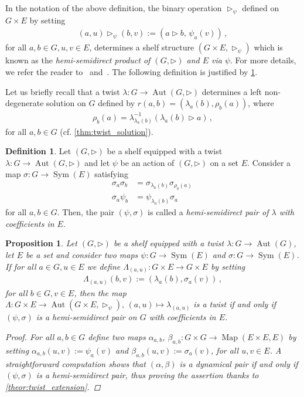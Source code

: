 \documentclass[preprint,1p]{elsarticle}
\numberwithin{equation}{section}
\newtheorem{prop}[theor]{Proposition}
\theoremstyle{definition}               %
\newtheorem{defin}[theor]{Definition}
\newcommand{\tr}{\triangleright}
\DeclareMathOperator{\Sym}{Sym}
\DeclareMathOperator{\Aut}{Aut}
\DeclareMathOperator{\Map}{Map}
\begin{document}
In the notation of the above definition, the binary operation $\tr_\psi$ defined on $G \times E$ by setting 
\begin{align*}
    (a,u) \tr_\psi (b,v) := (a \tr b,\, \psi_a(v)) \,,
\end{align*}
for all $a,b \in G, u,v \in E$, determines a shelf structure $(G \times E, \tr_\psi)$ which is known as the \emph{hemi-semidirect product of $(G,\tr)$ and $E$ via $\psi$}. For more details, we refer the reader to~\cite{CrWag14} and~\cite{Kin07}.
The following definition is justified by \cref{prop:twist_hemi_product}.

\medskip
{
Let us briefly recall that a twist $\lambda:G \to \Aut(G,\tr)$ determines a left non-degenerate solution on $G$ defined by $r(a,b) = (\lambda_a(b),\rho_b(a))$, where
\begin{align}\label{eq:rho_map}
    \rho_b(a) = \lambda_{\lambda_a(b)}^{-1}\left(\lambda_a(b) \tr a \right) \,,
\end{align}
for all $a,b \in G$ (cf. \cref{thm:twist_solution}).}

\begin{defin}
    Let $(G,\tr)$ be a shelf equipped with a twist $\lambda:G \to \Aut(G,\tr)$ and let $\psi$ be an action of $(G,\tr)$ on a set $E$. 
    Consider a map $\sigma:G \to \Sym(E)$ satisfying
    \begin{align} 
            \sigma_a\sigma_b &= \sigma_{\lambda_a(b)}\sigma_{\rho_b(a)} \label{eq:hemi_sol1} \, \\
            \sigma_a\psi_b &= \psi_{\lambda_a(b)}\sigma_a \label{eq:hemi_sol2} \,
    \end{align}
    for all $a,b \in G$.
    Then, the pair $(\psi,\sigma)$ is called a \emph{hemi-semidirect pair of $\lambda$ with coefficients in $E$}.
\end{defin}

\begin{prop}\label{prop:twist_hemi_product}
    Let $(G,\tr)$ be a shelf equipped with a twist $\lambda:G \to \Aut(G)$, let $E$ be a set and consider two maps $\psi:G \to \Sym(E)$ and $\sigma:G \to \Sym(E)$.
    If for all $a \in G, u \in E$ we define ${\Lambda}_{(a,u)}:G \times E \to G \times E$ by setting
    \begin{align*}
        {\Lambda}_{(a,u)}(b,v) := (\lambda_a(b),\sigma_a(v)) \,,
    \end{align*}
    for all $b \in G, v \in E$, then the map ${\Lambda}:G \times E \to \Aut(G \times E, \tr_\psi),\, (a,u) \mapsto \lambda_{(a,u)}$ is a twist if and only if $(\psi,\sigma)$ is a hemi-semidirect pair on $G$ with coefficients in $E$.
    \begin{proof}
        For all $a,b \in G$ define two maps $\alpha_{a,b}$, $\beta_{a,b}:G \times G \to \Map(E \times E, E)$ by setting $\alpha_{a,b}(u,v) := \psi_a(v)$ and $\beta_{a,b}(u,v) := \sigma_a(v)$, for all $u,v \in E$.
        A straightforward computation shows that $(\alpha,\beta)$ is a dynamical pair if and only if $(\psi,\sigma)$ is a hemi-semidirect pair, thus proving the assertion thanks to \cref{theor:twist_extension}.
    \end{proof}
\end{prop}
\end{document}
